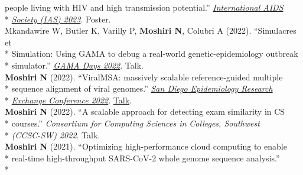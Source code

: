 \documentclass[margin,line]{res}
\begin{document}
\begin{resume}
\hspace*{9mm} people living with HIV and high transmission potential.'' \href{https://www.iasociety.org/conferences/ias2023}{\textit{International AIDS}}\\*\vspace{2mm}
\hspace*{9mm}\href{https://www.iasociety.org/conferences/ias2023}{\textit{Society (IAS) 2023}}. Poster.\\
\hspace*{4mm} Mkandawire W, Butler K, Varilly P, \textbf{Moshiri N}, Colubri A (2022). ``Simulacres et\\*
\hspace*{9mm} Simulation: Using GAMA to debug a real-world genetic-epidemiology outbreak\\*\vspace{2mm}
\hspace*{8mm} simulator.'' \href{https://gama-platform.org/Gama-Days-2022/}{\textit{GAMA Days 2022}}. Talk.\\
\hspace*{4mm} \textbf{Moshiri N} (2022). ``ViralMSA: massively scalable reference-guided multiple\\*
\hspace*{9mm} sequence alignment of viral genomes.'' \href{https://publichealth.sdsu.edu/epiexchange}{\textit{San Diego Epidemiology Research}}\\*\vspace{2mm}
\hspace*{8mm} \href{https://publichealth.sdsu.edu/epiexchange}{\textit{Exchange Conference 2022}}. \href{https://docs.google.com/document/d/e/2PACX-1vTufgGn-94tzBuzs1MXideQPxZApXW0EvSHIyfKQX8xdXPvwVo1H3C4WbWSgmp67BbERnjzc_tkYqdm/pub}{Talk}.\\
\hspace*{4mm} \textbf{Moshiri N} (2022). ``A scalable approach for detecting exam similarity in CS\\*
\hspace*{9mm} courses.'' \textit{Consortium for Computing Sciences in Colleges, Southwest}\\*\vspace{2mm}
\hspace*{8mm} \textit{(CCSC-SW) 2022}. Talk.\\
\hspace*{4mm} \textbf{Moshiri N} (2021). ``Optimizing high-performance cloud computing to enable\\*
\hspace*{9mm} real-time high-throughput SARS-CoV-2 whole genome sequence analysis.''\\*\vspace{2mm}

\end{resume}
\end{document}
